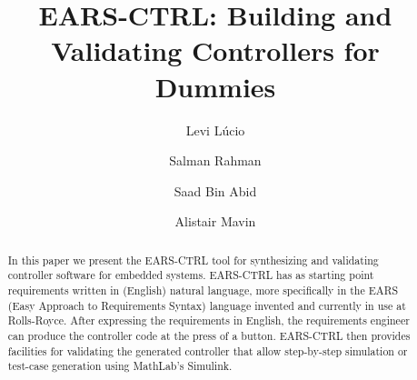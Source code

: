 \documentclass{llncs}
\begin{document}
%
\frontmatter          %

\mainmatter              %
%
\title{EARS-CTRL: Building and Validating Controllers for Dummies}
%
\titlerunning{}  %
%
\author{Levi L\'ucio \and Salman Rahman
 \and Saad Bin Abid \and Alistair Mavin}
%
\authorrunning{} %
%
\tocauthor{}
%

\maketitle              %
\vspace{-.5cm}
\begin{abstract}
In this paper we present the EARS-CTRL tool for synthesizing and 
validating controller software for embedded systems. EARS-CTRL has as starting
point requirements written in (English) natural language, more specifically in
the EARS (Easy Approach to Requirements Syntax) language invented and currently
in use at Rolls-Royce. After expressing the requirements in English, the
requirements engineer can produce the controller code at the press of a button.
EARS-CTRL then provides facilities for validating the generated controller that
allow step-by-step simulation or test-case generation using MathLab's
Simulink.\vspace{-.4cm} 
\end{abstract}

 








\vspace{-.4cm}
%

%
% 


\end{document}
